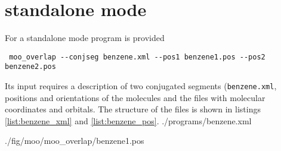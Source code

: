 
\chapter{\moo standalone mode}
\label{sec:moo_standalone}

For a standalone mode program \overlap is provided 
\begin{verbatim}
 moo_overlap --conjseg benzene.xml --pos1 benzene1.pos --pos2 benzene2.pos
\end{verbatim}
Its input requires a description of two conjugated segments (\texttt{benzene.xml}, positions and orientations of the molecules and the files with molecular coordinates and orbitals. The structure of the files is shown in listings \ref{list:benzene_xml} and  \ref{list:benzene_pos}.
\vskip 0.1cm
 {./programs/benzene.xml}

\vskip 0.1cm

 {./fig/moo/moo_overlap/benzene1.pos}

